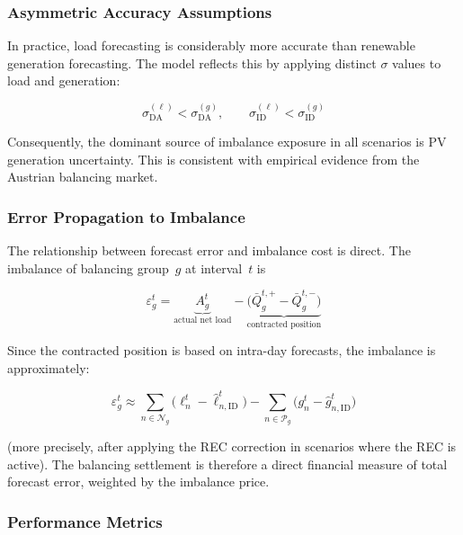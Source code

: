\documentclass[12pt,a4paper]{article}
\begin{document}
\subsubsection{Asymmetric Accuracy Assumptions}

In practice, load forecasting is considerably more accurate than renewable
generation forecasting.  The model reflects this by applying distinct
$\sigma$ values to load and generation:

\begin{equation}
\sigma_{\mathrm{DA}}^{(\ell)} < \sigma_{\mathrm{DA}}^{(g)}, \qquad
\sigma_{\mathrm{ID}}^{(\ell)} < \sigma_{\mathrm{ID}}^{(g)}
\label{eq:asymmetric_sigma}
\end{equation}

Consequently, the dominant source of imbalance exposure in all scenarios is
PV generation uncertainty.  This is consistent with empirical evidence from
the Austrian balancing market.

\subsubsection{Error Propagation to Imbalance}

The relationship between forecast error and imbalance cost is direct.  The
imbalance of balancing group~$g$ at interval~$t$ is

\begin{equation}
\varepsilon_{g}^{t}
  = \underbrace{A_{g}^{t}}_{\text{actual net load}}
  - \underbrace{\bigl(\bar{Q}_{g}^{t,+} - \bar{Q}_{g}^{t,-}\bigr)}_{\text{contracted position}}
\label{eq:imbalance_error}
\end{equation}

Since the contracted position is based on intra-day forecasts, the imbalance
is approximately:

\begin{equation}
\varepsilon_{g}^{t} \approx
  \sum_{n \in \mathcal{N}_{g}} \bigl(\ell_{n}^{t} - \hat{\ell}_{n,\mathrm{ID}}^{t}\bigr)
  - \sum_{n \in \mathcal{P}_{g}} \bigl(g_{n}^{t} - \hat{g}_{n,\mathrm{ID}}^{t}\bigr)
\label{eq:imbalance_error_approx}
\end{equation}

(more precisely, after applying the REC correction in scenarios where the
REC is active).  The balancing settlement is therefore a direct financial
measure of total forecast error, weighted by the imbalance price.

\subsubsection{Performance Metrics}
\end{document}
